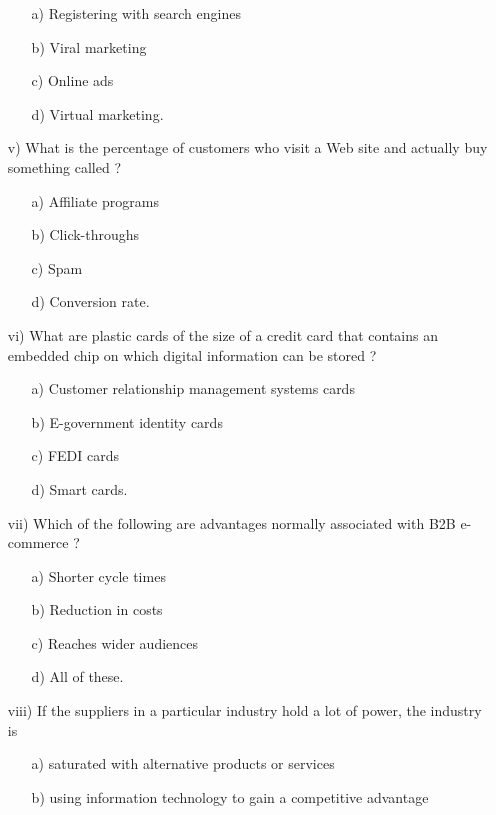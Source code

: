 \begin{enumerate}
    \begin{enumerate}
        \item[a)] Registering with search engines
        \item[b)] Viral marketing
        \item[c)] Online ads
        \item[d)] Virtual marketing.
    \end{enumerate}
    \item[v)] What is the percentage of customers who visit a Web site and actually buy something called ?
    \begin{enumerate}
        \item[a)] Affiliate programs
        \item[b)] Click-throughs
        \item[c)] Spam
        \item[d)] Conversion rate.
    \end{enumerate}
    \item[vi)] What are plastic cards of the size of a credit card that contains an embedded chip on which digital information can be stored ?
    \begin{enumerate}
        \item[a)] Customer relationship management systems cards
        \item[b)] E-government identity cards
        \item[c)] FEDI cards
        \item[d)] Smart cards.
    \end{enumerate}
    \item[vii)] Which of the following are advantages normally associated with B2B e-commerce ?
    \begin{enumerate}
        \item[a)] Shorter cycle times
        \item[b)] Reduction in costs
        \item[c)] Reaches wider audiences
        \item[d)] All of these.
    \end{enumerate}
    \item[viii)] If the suppliers in a particular industry hold a lot of power, the industry is
    \begin{enumerate}
        \item[a)] saturated with alternative products or services
        \item[b)] using information technology to gain a competitive advantage

\end{enumerate}
\end{enumerate}
